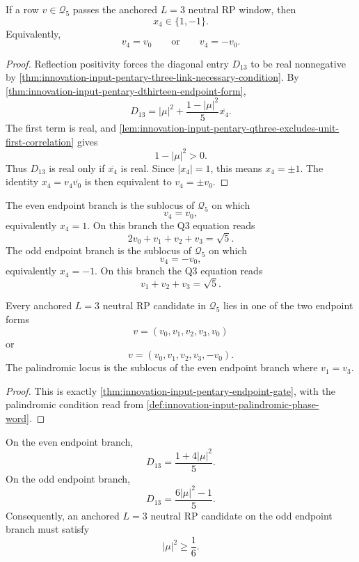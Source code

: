 \begin{theorem}
\label{thm:innovation-input-pentary-endpoint-gate}
If a row $v\in\mathcal Q_5$ passes the anchored $L=3$ neutral RP window,
then
$$
x_4\in\{1,-1\}.
$$
Equivalently,
$$
v_4=v_0
\qquad
\text{or}
\qquad
v_4=-v_0.
$$
\end{theorem}

\begin{proof}
Reflection positivity forces the diagonal entry $D_{13}$ to be real
nonnegative by
\autoref{thm:innovation-input-pentary-three-link-necessary-condition}.
By
\autoref{thm:innovation-input-pentary-dthirteen-endpoint-form},
$$
D_{13}
=
|\mu|^2+\frac{1-|\mu|^2}{5}\overline{x_4}.
$$
The first term is real, and
\autoref{lem:innovation-input-pentary-qthree-excludes-unit-first-correlation}
gives
$$
1-|\mu|^2>0.
$$
Thus $D_{13}$ is real only if $\overline{x_4}$ is real. Since
$|x_4|=1$, this means $x_4=\pm1$. The identity
$x_4=v_4\overline{v_0}$ is then equivalent to $v_4=\pm v_0$.
\end{proof}

\begin{definition}
\label{def:innovation-input-pentary-endpoint-branches}
The even endpoint branch is the sublocus of $\mathcal Q_5$ on which
$$
v_4=v_0,
$$
equivalently $x_4=1$. On this branch the Q3 equation reads
$$
2v_0+v_1+v_2+v_3=\sqrt5.
$$
The odd endpoint branch is the sublocus of $\mathcal Q_5$ on which
$$
v_4=-v_0,
$$
equivalently $x_4=-1$. On this branch the Q3 equation reads
$$
v_1+v_2+v_3=\sqrt5.
$$
\end{definition}

\begin{corollary}
\label{cor:innovation-input-endpoint-branch-form-candidates}
Every anchored $L=3$ neutral RP candidate in $\mathcal Q_5$ lies in one
of the two endpoint forms
$$
v=(v_0,v_1,v_2,v_3,v_0)
$$
or
$$
v=(v_0,v_1,v_2,v_3,-v_0).
$$
The palindromic locus is the sublocus of the even endpoint branch where
$v_1=v_3$.
\end{corollary}

\begin{proof}
This is exactly
\autoref{thm:innovation-input-pentary-endpoint-gate}, with the
palindromic condition read from
\autoref{def:innovation-input-palindromic-phase-word}.
\end{proof}

\begin{corollary}
\label{cor:innovation-input-middle-link-values-endpoint-branches}
On the even endpoint branch,
$$
D_{13}=\frac{1+4|\mu|^2}{5}.
$$
On the odd endpoint branch,
$$
D_{13}=\frac{6|\mu|^2-1}{5}.
$$
Consequently, an anchored $L=3$ neutral RP candidate on the odd endpoint
branch must satisfy
$$
|\mu|^2\ge\frac16.
$$
\end{corollary}

